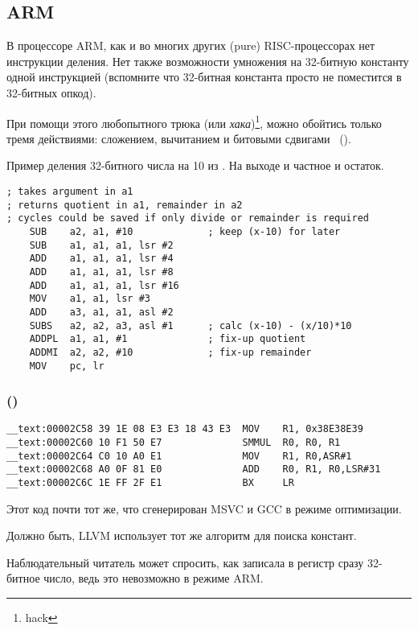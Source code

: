 ﻿\subsection{ARM}

В процессоре ARM, как и во многих других  (pure) RISC-процессорах нет инструкции деления.
Нет также возможности умножения на 32-битную константу одной инструкцией (вспомните что 32-битная
константа просто не поместится в 32-битных опкод).

При помощи этого любопытного трюка (или \emph{хака})\footnote{hack}, можно обойтись только тремя действиями: 
сложением, вычитанием и битовыми сдвигами
~().

Пример деления 32-битного числа на 10 из
.
На выходе и частное и остаток.

\begin{lstlisting}[style=customasmARM]
; takes argument in a1
; returns quotient in a1, remainder in a2
; cycles could be saved if only divide or remainder is required
    SUB    a2, a1, #10             ; keep (x-10) for later
    SUB    a1, a1, a1, lsr #2
    ADD    a1, a1, a1, lsr #4
    ADD    a1, a1, a1, lsr #8
    ADD    a1, a1, a1, lsr #16
    MOV    a1, a1, lsr #3
    ADD    a3, a1, a1, asl #2
    SUBS   a2, a2, a3, asl #1      ; calc (x-10) - (x/10)*10
    ADDPL  a1, a1, #1              ; fix-up quotient
    ADDMI  a2, a2, #10             ; fix-up remainder
    MOV    pc, lr
\end{lstlisting}

\subsubsection{\OptimizingXcodeIV (\ARMMode)}

\begin{lstlisting}[style=customasmARM]
__text:00002C58 39 1E 08 E3 E3 18 43 E3  MOV    R1, 0x38E38E39
__text:00002C60 10 F1 50 E7              SMMUL  R0, R0, R1
__text:00002C64 C0 10 A0 E1              MOV    R1, R0,ASR#1
__text:00002C68 A0 0F 81 E0              ADD    R0, R1, R0,LSR#31
__text:00002C6C 1E FF 2F E1              BX     LR
\end{lstlisting}

Этот код почти тот же, что сгенерирован MSVC и GCC в режиме оптимизации.

Должно быть, LLVM использует тот же алгоритм для поиска констант.

Наблюдательный читатель может спросить, как \MOV записала в регистр сразу 32-битное число, 
ведь это невозможно в режиме ARM.

